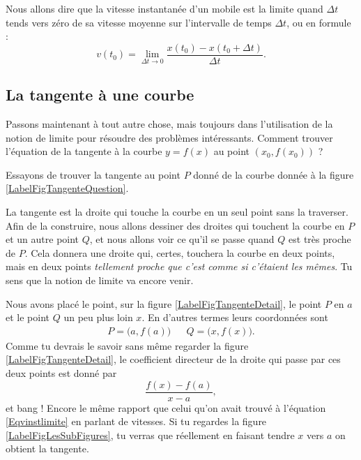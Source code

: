 Nous allons dire que la vitesse instantanée d'un mobile est la limite quand $\Delta t$ tends vers zéro de sa vitesse moyenne sur l'intervalle de temps $\Delta t$, ou en formule :
\begin{equation}		\label{Eqvinstlimite}
	v(t_0)=\lim_{\Delta t\to 0}\frac{ x(t_0)-x(t_0+\Delta t) }{ \Delta t }.
\end{equation}

\subsection{La tangente à une courbe}

Passons maintenant à tout autre chose, mais toujours dans l'utilisation de la notion de limite pour résoudre des problèmes intéressants. Comment trouver l'équation de la tangente à la courbe $y=f(x)$ au point $(x_0,f(x_0))$ ?

Essayons de trouver la tangente au point $P$ donné de la courbe donnée à la figure \ref{LabelFigTangenteQuestion}.

\newcommand{\CaptionFigTangenteQuestion}{Comment trouver la tangente à la courbe au point $P$ ?}


La tangente est la droite qui touche la courbe en un seul point sans la traverser. Afin de la construire, nous allons dessiner des droites qui touchent la courbe en $P$ et un autre point $Q$, et nous allons voir ce qu'il se passe quand $Q$ est très proche de $P$. Cela donnera une droite qui, certes, touchera la courbe en deux points, mais en deux points \emph{tellement proche que c'est comme si c'étaient les mêmes}. Tu sens que la notion de limite va encore venir.

\newcommand{\CaptionFigTangenteDetail}{Traçons d'abord une corde entre le point $P$ et un point $Q$ un peu plus loin.}


Nous avons placé le point, sur la figure \ref{LabelFigTangenteDetail}, le point $P$ en $a$ et le point $Q$ un peu plus loin $x$. En d'autres termes leurs coordonnées sont
\begin{align}
	P=\big(a,f(a)\big)&& Q=\big(x,f(x)\big).
\end{align}
Comme tu devrais le savoir sans même regarder la figure \ref{LabelFigTangenteDetail}, le coefficient directeur de la droite qui passe par ces deux points est donné par
\begin{equation}
	\frac{ f(x)-f(a) }{ x-a },
\end{equation}
et bang ! Encore le même rapport que celui qu'on avait trouvé à l'équation \eqref{Eqvinstlimite} en parlant de vitesses. Si tu regardes la figure \ref{LabelFigLesSubFigures}, tu verras que réellement en faisant tendre $x$ vers $a$ on obtient la tangente.

